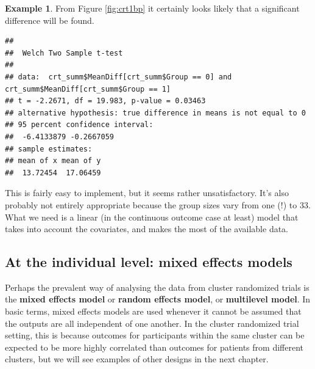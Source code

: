 \documentclass[
  openany]{book}
\newenvironment{Shaded}{\begin{snugshade}}{\end{snugshade}}
\newcommand{\AttributeTok}[1]{\textcolor[rgb]{0.13,0.29,0.53}{#1}}
\newcommand{\DecValTok}[1]{\textcolor[rgb]{0.00,0.00,0.81}{#1}}
\newcommand{\FunctionTok}[1]{\textcolor[rgb]{0.13,0.29,0.53}{\textbf{#1}}}
\newcommand{\NormalTok}[1]{#1}
\newcommand{\SpecialCharTok}[1]{\textcolor[rgb]{0.81,0.36,0.00}{\textbf{#1}}}
\newcommand{\StringTok}[1]{\textcolor[rgb]{0.31,0.60,0.02}{#1}}
\theoremstyle{definition}
\theoremstyle{definition}
\newtheorem{example}{Example}[chapter]
\theoremstyle{definition}
\theoremstyle{definition}
\theoremstyle{remark}
\begin{document}
\begin{example}
From Figure \ref{fig:crt1bp} it certainly looks likely that a significant difference will be found.

\begin{Shaded}
\end{Shaded}

\begin{verbatim}
## 
##  Welch Two Sample t-test
## 
## data:  crt_summ$MeanDiff[crt_summ$Group == 0] and crt_summ$MeanDiff[crt_summ$Group == 1]
## t = -2.2671, df = 19.983, p-value = 0.03463
## alternative hypothesis: true difference in means is not equal to 0
## 95 percent confidence interval:
##  -6.4133879 -0.2667059
## sample estimates:
## mean of x mean of y 
##  13.72454  17.06459
\end{verbatim}

\end{example}

This is fairly easy to implement, but it seems rather unsatisfactory. It's also probably not entirely appropriate because the group sizes vary from one (!) to 33. What we need is a linear (in the continuous outcome case at least) model that takes into account the covariates, and makes the most of the available data.

\subsection{At the individual level: mixed effects models}\label{at-the-individual-level-mixed-effects-models}

Perhaps the prevalent way of analysing the data from cluster randomized trials is the \textbf{mixed effects model} or \textbf{random effects model}, or \textbf{multilevel model}. In basic terms, mixed effects models are used whenever it cannot be assumed that the outputs are all independent of one another. In the cluster randomized trial setting, this is because outcomes for participants within the same cluster can be expected to be more highly correlated than outcomes for patients from different clusters, but we will see examples of other designs in the next chapter.
\end{document}
